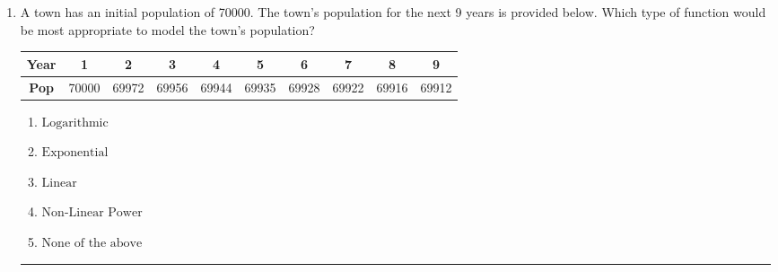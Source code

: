 \documentclass[14pt]{extbook}
\newcommand{\litem}[1]{\item#1\hspace*{-1cm}\rule{\textwidth}{0.4pt}}
\begin{document}
\begin{enumerate}
{\begin{enumerate}[label=\Alph*.]
\end{enumerate} }
\litem{
A town has an initial population of 70000. The town's population for the next 9 years is provided below. Which type of function would be most appropriate to model the town's population?

\begin{tabular}{c|c|c|c|c|c|c|c|c|c}
\textbf{Year} &1 &2 &3 &4 &5 &6 &7 &8 &9\tabularnewline \hline
\textbf{Pop} &70000 &69972 &69956 &69944 &69935 &69928 &69922 &69916 &69912\end{tabular}\begin{enumerate}[label=\Alph*.]
\item \( \text{Logarithmic} \)
\item \( \text{Exponential} \)
\item \( \text{Linear} \)
\item \( \text{Non-Linear Power} \)
\item \( \text{None of the above} \)

\end{enumerate} }
\end{enumerate}
\end{document}
